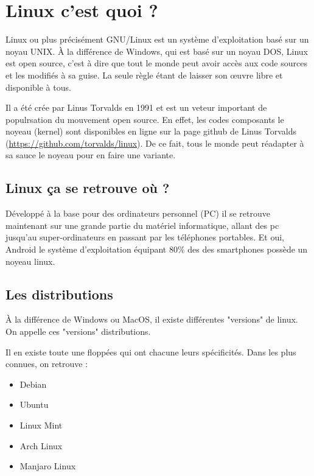 \chapter{Linux c'est quoi ?}

Linux ou plus précisément GNU/Linux est un système d'exploitation basé sur un noyau UNIX. À la différence de Windows, qui est basé sur un noyau DOS, Linux est open source, c'est à dire que tout le monde peut avoir accès aux code sources et les modifiés à sa guise. La seule règle étant de laisser son œuvre libre et disponible à tous.

Il a été crée par Linus Torvalds en 1991 et est un veteur important de populrsation du mouvement open source. En effet, les codes composants le noyeau (kernel) sont disponibles en ligne sur la page github de Linus Torvalds (\url{https://github.com/torvalds/linux}). De ce fait, tous le monde peut réadapter à sa sauce le noyeau pour en faire une variante.

\section{Linux ça se retrouve où ?}
Développé à la base pour des ordinateurs personnel (PC) il se retrouve maintenant sur une grande partie du matériel informatique, allant des pc jusqu'au super-ordinateurs en passant par les téléphones portables. Et oui, Android le système d'exploitation équipant 80\% des des smartphones possède un noyeau linux.

\section{Les distributions}
À la différence de Windows ou MacOS, il existe différentes "versions" de linux. On appelle ces "versions" distributions.


Il en existe toute une floppées qui ont chacune leurs spécificités. Dans les plus connues, on retrouve :
\begin{itemize}
	\item Debian
	\item Ubuntu
	\item Linux Mint
	\item Arch Linux
	\item Manjaro Linux
\end{itemize}


